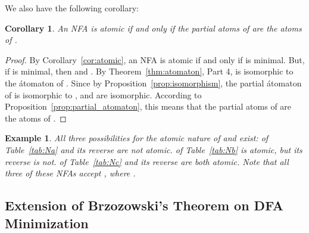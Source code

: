 \documentclass[preprint,12pt]{elsarticle}
\newcommand{\qedb}{\hfill}
\newtheorem{example}{Example}
\newtheorem{corollary}{Corollary}
\begin{document}
We also have the following corollary:

\begin{corollary}
\label{cor:atomic2}
An NFA  is atomic if and only if the partial atoms of  are the atoms of . 
\end{corollary}
\begin{proof}
By Corollary~\ref{cor:atomic}, an NFA  is atomic if and only if 
 is minimal. 
But, if  is minimal, then  and 
.
By Theorem~\ref{thm:atomaton}, Part 4, 
 is isomorphic to the \'atomaton  of . 
Since by Proposition~\ref{prop:isomorphism}, the partial \'atomaton  
of  is isomorphic to ,  and  
are isomorphic. According to Proposition~\ref{prop:partial_atomaton},
this means that the partial atoms of  are the atoms of . 
\end{proof}


\begin{example}
\label{ex:atomicity}
All three possibilities for the atomic nature of  and  exist:
 of Table~\ref{tab:Na} and its reverse are not atomic.
 of Table~\ref{tab:Nb} is atomic, but its reverse is not.
 of Table~\ref{tab:Nc} and its reverse are both atomic.
Note that all three of these NFAs accept , where .
\qedb
\begin{table}[b]
\begin{minipage}[b]{0.3\linewidth}
\caption{.}
\label{tab:Na}
{\footnotesize
\begin{center}

\end{center}}
\end{minipage}
\hspace{0.3cm}
\begin{minipage}[b]{0.3\linewidth}
\caption{.}
\label{tab:Nb}
{\footnotesize
\begin{center}

\end{center}}
\end{minipage}
\hspace{0.55cm}
\begin{minipage}[b]{0.3\linewidth}
\caption{.}
\label{tab:Nc}
{\footnotesize
\begin{center}

\end{center}}
\end{minipage}

\end{table}

\end{example}

\subsection{Extension of Brzozowski's Theorem on DFA Minimization}
\label{sec:extension}
\end{document}

